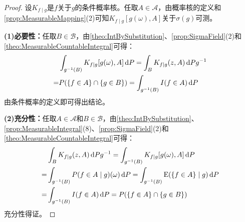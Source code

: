 \begin{proof}
	设$K_{f\mid g}$是$f$关于$g$的条件概率核。任取$A\in\mathscr{A}$，由概率核的定义和\cref{prop:MeasurableMapping}(2)可知$K_{f\mid g}[g(\omega),A]$关于$\sigma(g)$可测。\par
	\textbf{(1)必要性：}任取$B\in\mathscr{B}$，由\cref{theo:IntBySubstitution}、\cref{prop:SigmaField}(2)和\cref{theo:MeasurableCountableIntegral}可得：
	\begin{align*}
		&\int_{g^{-1}(B)}K_{f\mid g}[g(\omega),A]\mathop{}\!\mathrm{d} P=\int_{B}K_{f\mid g}(z,A)\mathop{}\!\mathrm{d} Pg^{-1} \\
		=&P(\{f\in A\}\cap\{g\in B\})=\int_{g^{-1}(B)}I(f\in A)\mathop{}\!\mathrm{d} P
	\end{align*}
	由条件概率的定义即可得出结论。\par
	\textbf{(2)充分性：}任取$A\in\mathscr{A}$和$B\in\mathscr{B}$，由\cref{theo:IntBySubstitution}、\cref{prop:MeasurableIntegral}(8)、\cref{prop:SigmaField}(2)和\cref{theo:MeasurableCountableIntegral}可得：
	\begin{align*}
		&\int_{B}K_{f\mid g}(z,A)\mathop{}\!\mathrm{d} Pg^{-1}=\int_{g^{-1}(B)}K_{f\mid g}[g(\omega),A]\mathop{}\!\mathrm{d} P \\
		=&\int_{g^{-1}(B)}P(f\in A\mid g)(\omega)\mathop{}\!\mathrm{d} P=\int_{g^{-1}(B)}\operatorname{E}(\{f\in A\}\mid g)\mathop{}\!\mathrm{d} P \\
		=&\int_{g^{-1}(B)}I(f\in A)\mathop{}\!\mathrm{d} P=P(\{f\in A\}\cap\{g\in B\})
	\end{align*}
	充分性得证。
\end{proof}
